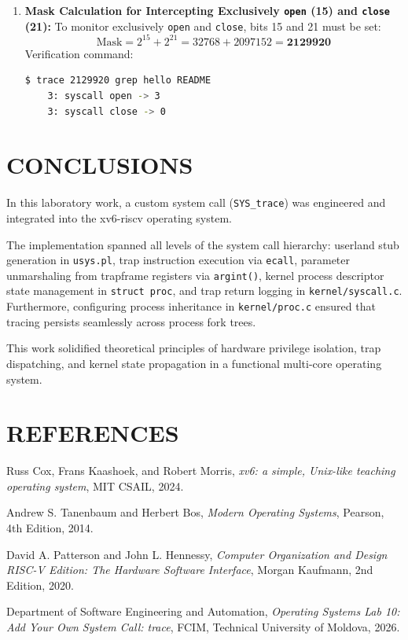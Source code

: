 \documentclass[12pt,a4paper]{report}
\numberwithin{equation}{chapter}
\numberwithin{figure}{chapter}
\numberwithin{table}{chapter}
\begin{document}
\begin{enumerate}
    \item \textbf{Mask Calculation for Intercepting Exclusively \texttt{open} (15) and \texttt{close} (21):}  
    To monitor exclusively \texttt{open} and \texttt{close}, bits 15 and 21 must be set:
    \begin{equation}
    \text{Mask} = 2^{15} + 2^{21} = 32768 + 2097152 = \mathbf{2129920}
    \end{equation}
    Verification command:
    \begin{lstlisting}[language=bash]
    $ trace 2129920 grep hello README
    3: syscall open -> 3
    3: syscall close -> 0
    \end{lstlisting}
\end{enumerate}

\chapter{CONCLUSIONS}
In this laboratory work, a custom system call (\texttt{SYS\_trace}) was engineered and integrated into the xv6-riscv operating system.

The implementation spanned all levels of the system call hierarchy: userland stub generation in \texttt{usys.pl}, trap instruction execution via \texttt{ecall}, parameter unmarshaling from trapframe registers via \texttt{argint()}, kernel process descriptor state management in \texttt{struct proc}, and trap return logging in \texttt{kernel/syscall.c}. Furthermore, configuring process inheritance in \texttt{kernel/proc.c} ensured that tracing persists seamlessly across process fork trees.

This work solidified theoretical principles of hardware privilege isolation, trap dispatching, and kernel state propagation in a functional multi-core operating system.

\chapter*{REFERENCES}

\noindent [1] Russ Cox, Frans Kaashoek, and Robert Morris, \textit{xv6: a simple, Unix-like teaching operating system}, MIT CSAIL, 2024.

\noindent [2] Andrew S. Tanenbaum and Herbert Bos, \textit{Modern Operating Systems}, Pearson, 4th Edition, 2014.

\noindent [3] David A. Patterson and John L. Hennessy, \textit{Computer Organization and Design RISC-V Edition: The Hardware Software Interface}, Morgan Kaufmann, 2nd Edition, 2020.

\noindent [4] Department of Software Engineering and Automation, \textit{Operating Systems Lab 10: Add Your Own System Call: trace}, FCIM, Technical University of Moldova, 2026.
\end{document}
